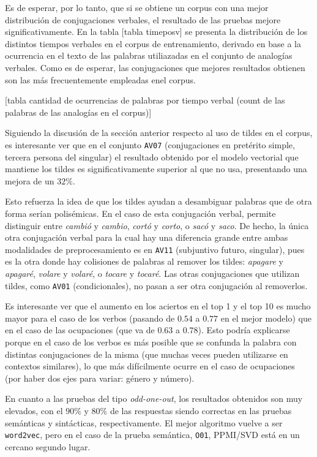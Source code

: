 Es de esperar, por lo tanto, que si se obtiene un corpus con una mejor distribución de conjugaciones
verbales, el resultado de las pruebas mejore significativamente. En la tabla [tabla timeposv] se
presenta la distribución de los distintos tiempos verbales en el corpus de entrenamiento, derivado
en base a la ocurrencia en el texto de las palabras utiliazadas en el conjunto de analogías
verbales. Como es de esperar, las conjugaciones que mejores resultados obtienen son las más
frecuentemente empleadas enel corpus.

[tabla cantidad de ocurrencias de palabras por tiempo verbal (count de las palabras de las analogías
en el corpus)]

Siguiendo la discusión de la sección anterior respecto al uso de tildes en el corpus, es interesante
ver que en el conjunto \texttt{AV07} (conjugaciones en pretérito simple, tercera persona del
singular) el resultado obtenido por el modelo vectorial que mantiene los tildes es
significativamente superior al que no usa, presentando una mejora de un $32\%$.

Esto refuerza la idea de que los tildes ayudan a desambiguar palabras que de otra forma serían
polisémicas. En el caso de esta conjugación verbal, permite distinguir entre \textit{cambió} y
\textit{cambio}, \textit{cortó} y \textit{corto}, o \textit{sacó} y \textit{saco}. De hecho, la
única otra conjugación verbal para la cual hay una diferencia grande entre ambas modalidades de
preprocesamiento es en \texttt{AV11} (subjuntivo futuro, singular), pues es la otra donde hay
colisiones de palabras al remover los tildes: \textit{apagare} y \textit{apagaré}, \textit{volare} y
\textit{volaré}, o \textit{tocare} y \textit{tocaré}. Las otras conjugaciones que utilizan tildes,
como \texttt{AV01} (condicionales), no pasan a ser otra conjugación al removerlos.

Es interesante ver que el aumento en los aciertos en el top 1 y el top 10 es mucho mayor para el
caso de los verbos (pasando de $0.54$ a $0.77$ en el mejor modelo) que en el caso de las ocupaciones
(que va de $0.63$ a $0.78$). Esto podría explicarse porque en el caso de los verbos es más posible
que se confunda la palabra con distintas conjugaciones de la misma (que muchas veces pueden
utilizarse en contextos similares), lo que más difícilmente ocurre en el caso de ocupaciones (por
haber dos ejes para variar: género y número).


En cuanto a las pruebas del tipo \textit{odd-one-out}, los resultados obtenidos son muy elevados,
con el $90\%$ y $80\%$ de las respuestas siendo correctas en las pruebas semánticas y sintácticas,
respectivamente. El mejor algoritmo vuelve a ser \texttt{word2vec}, pero en el caso de la prueba
semántica, \texttt{O01}, PPMI/SVD está en un cercano segundo lugar.

